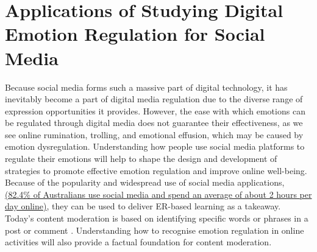 \documentclass[lettersize,journal]{IEEEtran}
\begin{document}



\section{Applications of Studying Digital Emotion Regulation for Social Media}
Because social media forms such a massive part of digital technology, it has inevitably become a part of digital media regulation due to the diverse range of expression opportunities it provides. However, the ease with which emotions can be regulated through digital media does not guarantee their effectiveness, as we see online rumination, trolling, and emotional effusion, which may be caused by emotion dysregulation. Understanding how people use social media platforms to regulate their emotions will help to shape the design and development of strategies to promote effective emotion regulation and improve online well-being. Because of the popularity and widespread use of social media applications,  \href{https://www.genroe.com/blog/social-media-statistics-australia/13492
}{(82.4\% of Australians use social media and spend an average of about 2 hours per day online)}, they can be used to deliver ER-based learning as a takeaway. Today's content moderation is based on identifying specific words or phrases in a post or comment \cite{thomas2022s}. Understanding how to recognise emotion regulation in online activities will also provide a factual foundation for content moderation.
\end{document}
